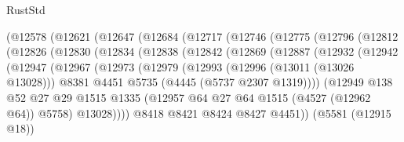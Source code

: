 \begin{lexlean}{RustStd}
\begin{coremodule}
{\begin{coremodule}
{{{{{{{{{{{{{{{{{{{{{{{{{{{{{{{{{{{{{{            (@12578
              (@12621
                (@12647
                  (@12684
                    (@12717
                      (@12746
                        (@12775
                          (@12796
                            (@12812
                              (@12826
                                (@12830
                                  (@12834
                                    (@12838
                                      (@12842
                                        (@12869
                                          (@12887
                                            (@12932
                                              (@12942
                                                (@12947
                                                  (@12967
                                                    (@12973
                                                      (@12979
                                                        (@12993
                                                          (@12996 (@13011 (@13026 @13028)))
                                                          @8381
                                                          @4451
                                                          @5735
                                                          (@4445 (@5737 @2307 @1319))))
                                                      (@12949
                                                        @138
                                                        @52
                                                        @27
                                                        @29
                                                        @1515
                                                        @1335
                                                        (@12957
                                                          @64
                                                          @27
                                                          @64
                                                          @1515
                                                          (@4527 (@12962 @64))
                                                          @5758)
                                                        @13028))))
                                                @8418
                                                @8421
                                                @8424
                                                @8427
                                                @4451))
                                            (@5581 (@12915 @18))
}}}}}}}}}}}}}}}}}}}}}}}}}}}}}}}}}}}}}}
\end{coremodule}}
\end{coremodule}
\end{lexlean}
